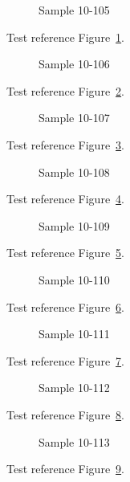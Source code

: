 \begin{figure}[tbhp]
\caption{Sample 10-105}
\label{fig:sample-10-105}
\end{figure}

Test reference Figure~\ref{fig:sample-10-105}.

\begin{figure}[tbhp]
\caption{Sample 10-106}
\label{fig:sample-10-106}
\end{figure}

Test reference Figure~\ref{fig:sample-10-106}.

\begin{figure}[tbhp]
\caption{Sample 10-107}
\label{fig:sample-10-107}
\end{figure}

Test reference Figure~\ref{fig:sample-10-107}.

\begin{figure}[tbhp]
\caption{Sample 10-108}
\label{fig:sample-10-108}
\end{figure}

Test reference Figure~\ref{fig:sample-10-108}.

\begin{figure}[tbhp]
\caption{Sample 10-109}
\label{fig:sample-10-109}
\end{figure}

Test reference Figure~\ref{fig:sample-10-109}.

\begin{figure}[tbhp]
\caption{Sample 10-110}
\label{fig:sample-10-110}
\end{figure}

Test reference Figure~\ref{fig:sample-10-110}.

\begin{figure}[tbhp]
\caption{Sample 10-111}
\label{fig:sample-10-111}
\end{figure}

Test reference Figure~\ref{fig:sample-10-111}.

\begin{figure}[tbhp]
\caption{Sample 10-112}
\label{fig:sample-10-112}
\end{figure}

Test reference Figure~\ref{fig:sample-10-112}.

\begin{figure}[tbhp]
\caption{Sample 10-113}
\label{fig:sample-10-113}
\end{figure}

Test reference Figure~\ref{fig:sample-10-113}.

